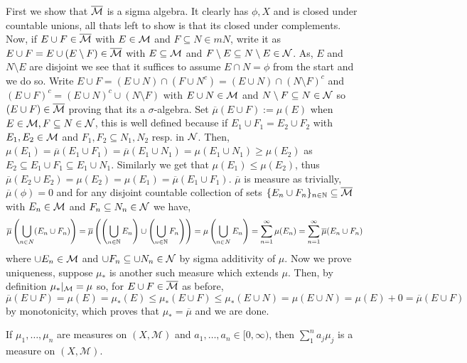 \documentclass[12pt,a4paper]{article}
\begin{document}
\begin{solution}
    First we show that $\overline{\mathcal{M}}$ is a sigma algebra. It clearly has $\phi,X$ and is closed under countable unions, all thats left to show is that its closed under complements. Now, if $E\cup F\in\overline{\mathcal{M}}$ with $E\in\mathcal{M}$ and $F\subseteq N\in mN$, write it as $E\cup F=E\cup(E\setminus F)\in\overline{\mathcal{M}}$ with $E\subseteq\mathcal{M}$ and $F\setminus E\subseteq N\setminus E\in\mathcal{N}$. 
    As, $E$ and $N\setminus E$ are disjoint we see that it suffices to assume $E\cap N=\phi$ from the start and we do so. 
    Write $E\cup F=(E\cup N)\cap(F\cup N^c)=(E\cup N)\cap(N\setminus F)^c$ and $(E\cup F)^c=(E\cup N)^c\cup(N\setminus F)$ with $E\cup N\in\mathcal{M}$ and $N\setminus F\subseteq N\in\mathcal{N}$ so $(E\cup F)\in\overline{\mathcal{M}}$ proving that its a $\sigma$-algebra. 
    Set $\overline{\mu}(E\cup F):=\mu(E)$ when $E\in\mathcal{M},F\subseteq N\in\mathcal{N}$, this is well defined because if $E_1\cup F_1=E_2\cup F_2$ with $E_1,E_2\in\mathcal{M}$ and $F_1,F_2\subseteq N_1,N_2$ resp. in $\mathcal{N}$. 
    Then, $\mu(E_1)=\overline{\mu}(E_1\cup F_1)=\overline{\mu}(E_1\cup N_1)=\mu(E_1\cup N_1)\geq\mu(E_2)$ as $E_2\subseteq E_1\cup F_1\subseteq E_1\cup N_1$. 
    Similarly we get that $\mu(E_1)\leq\mu(E_2)$, thus $\overline{\mu}(E_2\cup E_2)=\mu(E_2)=\mu(E_1)=\overline{\mu}(E_1\cup F_1)$. 
    $\overline{\mu}$ is measure as trivially, $\overline{\mu}(\phi)=0$ and for any disjoint countable collection of sets $\{E_n\cup F_n\}_{n\in\mathbb{N}}\subseteq\overline{\mathcal{M}}$ with $E_n\in\mathcal{M}$ and $F_n\subseteq N_n\in\mathcal{N}$ we have,
    $$\overline{\mu}\left(\bigcup_{n\in N}(E_n\cup F_n)\right)=\overline{\mu}\left(\left(\bigcup_{n\in\mathbb{N}}E_n\right)\cup\left(\bigcup_{n\in\mathbb{N}}F_n\right)\right)=\mu\left(\bigcup_{n\in N}E_n\right)=\sum_{n=1}^\infty\mu(E_n)=\sum_{n=1}^\infty \overline{\mu}(E_n\cup F_n)$$
    where $\cup E_n\in\mathcal{M}$ and $\cup F_n\subseteq\cup N_n\in\mathcal{N}$ by sigma additivity of $\mu.$
    Now we prove uniqueness, suppose $\mu_*$ is another such measure which extends $\mu$. 
    Then, by definition $\mu_*|_{\mathcal{M}}=\mu$ so, for $E\cup F\in\overline{\mathcal{M}}$ as before, 
    $$\overline{\mu}(E\cup F)=\mu(E)=\mu_*(E)\leq\mu_*(E\cup F)\leq\mu_*(E\cup N)=\mu(E\cup N)=\mu(E)+0=\overline{\mu}(E\cup F)$$
    by monotonicity, which proves that $\mu_*=\overline{\mu}$ and we are done.
\end{solution}
\begin{problem}\label{prob:1-7}
If $\mu_1, \dots, \mu_n$ are measures on $(X, \mathcal{M})$ and $a_1, \dots, a_n \in [0, \infty)$, then $\sum_{1}^{n} a_j \mu_j$ is a measure on $(X, \mathcal{M})$.
\end{problem}
\end{document}
